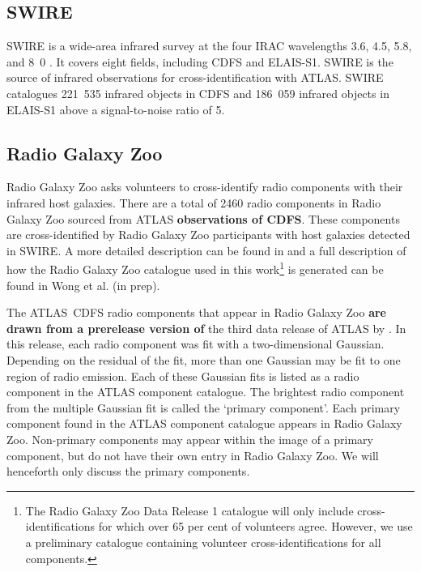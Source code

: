 \documentclass[fleqn,usenatbib,usedcolumn]{mnras}
\newcommand{\edited}[1]{{\bf {#1}}}
\begin{document}
  \subsection{SWIRE}\label{sec:swire}

    SWIRE \citep{lonsdale03swire, surace05swire} is a wide-area infrared
    survey at the four IRAC wavelengths 3.6, 4.5, 5.8, and
    \unit{8.0}{\micro\meter} \citep{lonsdale03swire}. It covers eight fields, including CDFS and ELAIS-S1. SWIRE is the source of infrared
    observations for cross-identification with ATLAS. SWIRE catalogues 221~535
    infrared objects in CDFS and 186~059 infrared objects in ELAIS-S1 above a signal-to-noise ratio of 5.

  \subsection{Radio Galaxy Zoo}\label{sec:rgz}

    Radio Galaxy Zoo asks volunteers to cross-identify radio components with
    their infrared host galaxies. There are a total of 2460 radio components
    in Radio Galaxy Zoo sourced from ATLAS \edited{observations of CDFS}. These components are
    cross-identified by Radio Galaxy Zoo participants with host galaxies
    detected in SWIRE. A more detailed description can be found in
    \citet{banfield15} and a full description of how the Radio Galaxy Zoo catalogue used in this work\footnote{The Radio Galaxy Zoo Data
    Release 1 catalogue will only include cross-identifications for which over
    65 per cent of volunteers agree. However, we use a preliminary catalogue containing volunteer
    cross-identifications for all components.} is generated can be found in Wong
    et al. (in prep).

    The ATLAS~CDFS radio components that appear in Radio Galaxy Zoo \edited{are drawn from a prerelease version of} the third data release
    of ATLAS by \citet{franzen15}. In this release, each radio component was fit with a
    two-dimensional Gaussian. Depending on the residual of the fit, more than
    one Gaussian may be fit to one region of radio emission. Each of these
    Gaussian fits is listed as a radio component in the ATLAS component catalogue. The
    brightest radio component from the multiple Gaussian fit is called the
    `primary component'. Each primary component found in the ATLAS
    component catalogue appears in Radio Galaxy Zoo. Non-primary components
    may appear within the image of a primary component, but do not have their
    own entry in Radio Galaxy Zoo. We will henceforth only discuss the primary
    components.
\end{document}

